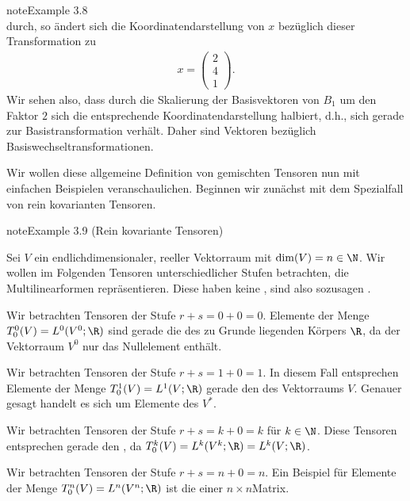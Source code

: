 \documentclass[letterpaper,10pt,english]{jupyterBook}
\begin{document}
\begin{sphinxadmonition}{note}{Example 3.8}
\begin{equation*}
\end{equation*}
\sphinxAtStartPar
durch, so ändert sich die Koordinatendarstellung von \(x\) bezüglich dieser Transformation zu
\begin{equation*}
\begin{split}x = \begin{pmatrix}2\\ 4\\ 1\end{pmatrix}.\end{split}
\end{equation*}
\sphinxAtStartPar
Wir sehen also, dass durch die Skalierung der Basisvektoren von \(B_1\) um den Faktor \(2\) sich die entsprechende Koordinatendarstellung halbiert, d.h., sich gerade  zur Basistransformation verhält.
Daher sind Vektoren  bezüglich Basiswechseltransformationen.
\end{sphinxadmonition}

\sphinxAtStartPar
Wir wollen diese allgemeine Definition von gemischten Tensoren nun mit einfachen Beispielen veranschaulichen.
Beginnen wir zunächst mit dem Spezialfall von rein kovarianten Tensoren.
\label{vektoranalysis/tensor:example-22}
\begin{sphinxadmonition}{note}{Example 3.9 (Rein kovariante Tensoren)}



\sphinxAtStartPar
Sei \(V\) ein endlich\sphinxhyphen{}dimensionaler, reeller Vektorraum mit \(\operatorname{dim}(V) = n \in \N\).
Wir wollen im Folgenden Tensoren unterschiedlicher Stufen betrachten, die Multilinearformen repräsentieren.
Diese haben keine , sind also sozusagen .

\sphinxAtStartPar
{}
Wir betrachten Tensoren der Stufe \(r+s=0+0=0\).
Elemente der Menge \(T^0_0(V) = L^0(V^0; \R)\) sind gerade die  des zu Grunde liegenden Körpers \(\R\), da der Vektorraum \(V^0\) nur das Nullelement enthält.

\sphinxAtStartPar
{}
Wir betrachten Tensoren der Stufe \(r+s=1+0=1\).
In diesem Fall entsprechen Elemente der Menge \(T^1_0(V) = L^1(V; \R)\) gerade den  des Vektorraums \(V\).
Genauer gesagt handelt es sich um Elemente des  \(V^\ast\).

\sphinxAtStartPar
{}
Wir betrachten Tensoren der Stufe \(r+s=k+0=k\) für \(k\in \N\).
Diese Tensoren entsprechen gerade den , da \(T^k_0(V) = L^k(V^k; \R) = L^k(V; \R)\).

\sphinxAtStartPar
{}
Wir betrachten Tensoren der Stufe \(r+s=n+0=n\).
Ein Beispiel für Elemente der Menge \(T^n_0(V) = L^n(V^n; \R)\) ist die  einer \(n \times n\)\sphinxhyphen{}Matrix.
\end{sphinxadmonition}
\end{document}
